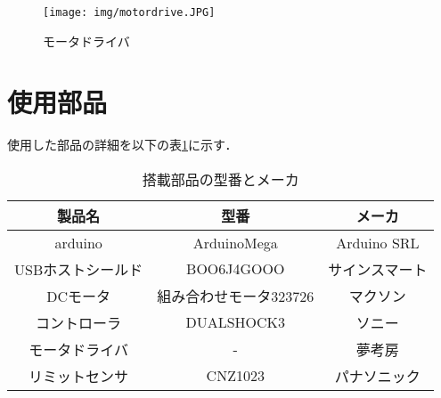 \begin{figure}[!htbp]
  \begin{center}
    \texttt{[image: img/motordrive.JPG]}
    \end{center}
  \caption{モータドライバ}
 \label{fig:motordrive}
\end{figure}

\section{使用部品}
使用した部品の詳細を以下の表\ref{tab:parts}に示す．

\begin{table}[!htb]
 \begin{center}
  \caption{搭載部品の型番とメーカ}
  \begin{tabular}[htbp]{|c|c|c|}
   \hline
   製品名&型番&メーカ \\
   \hline
   arduino&ArduinoMega&Arduino SRL\\
   \hline
   USBホストシールド&BOO6J4GOOO&サインスマート\\
   \hline
   DCモータ&組み合わせモータ323726&マクソン\\
   \hline
   コントローラ&DUALSHOCK3&ソニー\\
   \hline
   モータドライバ&-&夢考房\\
   \hline
   リミットセンサ&CNZ1023&パナソニック\\
   \hline
  \end{tabular}
  \label{tab:parts}
 \end{center}
\end{table}